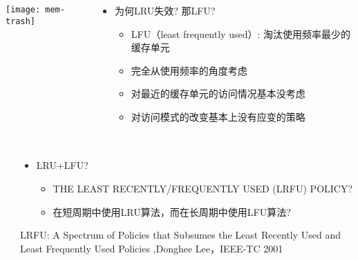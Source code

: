 \begin{frame}[plain]
	\frametitle{ }
	\begin{columns}
		\begin{column}{.5\textwidth}
			\centering
			\texttt{[image: mem-trash]}
		\end{column}
		
		\begin{column}{.5\textwidth}
			
			\begin{itemize}
				\item 为何LRU失效? 那LFU?
				\begin{itemize}
					
					\item   LFU（least frequently used）: 淘汰使用频率最少的缓存单元
					
					\item 完全从使用频率的角度考虑
					\item 对最近的缓存单元的访问情况基本没考虑
					\item 对访问模式的改变基本上没有应变的策略

				\end{itemize}
			\end{itemize}
			
			
		\end{column}
		
		
	\end{columns}
\end{frame}

\begin{frame}[plain]
	\frametitle{ }
	\begin{columns}
		\begin{column}{.1\textwidth}
			\centering
		\end{column}
		
		\begin{column}{1.0\textwidth}
			
			\begin{itemize}
				\item LRU+LFU? 
				
				
				\begin{itemize}
					\item THE LEAST RECENTLY/FREQUENTLY USED (LRFU) POLICY?
					
					\item   在短周期中使用LRU算法，而在长周期中使用LFU算法?
					
					
				\end{itemize}
			\end{itemize}
			
			\tiny LRFU: A Spectrum of Policies that Subsumes the Least Recently Used and Least Frequently Used Policies  ,Donghee Lee，IEEE-TC 2001
		\end{column}
		
		
	\end{columns}
\end{frame}

